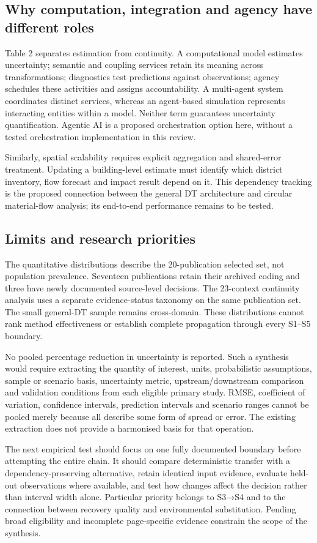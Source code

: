 \subsection{Why computation, integration and agency have different roles}
Table 2 separates estimation from continuity. A computational model estimates uncertainty; semantic and coupling services retain its meaning across transformations; diagnostics test predictions against observations; agency schedules these activities and assigns accountability. A multi-agent system coordinates distinct services, whereas an agent-based simulation represents interacting entities within a model. Neither term guarantees uncertainty quantification. Agentic AI is a proposed orchestration option here, without a tested orchestration implementation in this review.

Similarly, spatial scalability requires explicit aggregation and shared-error treatment. Updating a building-level estimate must identify which district inventory, flow forecast and impact result depend on it. This dependency tracking is the proposed connection between the general DT architecture and circular material-flow analysis; its end-to-end performance remains to be tested.


\subsection{Limits and research priorities}
The quantitative distributions describe the 20-publication selected set, not population prevalence. Seventeen publications retain their archived coding and three have newly documented source-level decisions. The 23-context continuity analysis uses a separate evidence-status taxonomy on the same publication set. The small general-DT sample remains cross-domain. These distributions cannot rank method effectiveness or establish complete propagation through every S1–S5 boundary.

No pooled percentage reduction in uncertainty is reported. Such a synthesis would require extracting the quantity of interest, units, probabilistic assumptions, sample or scenario basis, uncertainty metric, upstream/downstream comparison and validation conditions from each eligible primary study. RMSE, coefficient of variation, confidence intervals, prediction intervals and scenario ranges cannot be pooled merely because all describe some form of spread or error. The existing extraction does not provide a harmonised basis for that operation.

The next empirical test should focus on one fully documented boundary before attempting the entire chain. It should compare deterministic transfer with a dependency-preserving alternative, retain identical input evidence, evaluate held-out observations where available, and test how changes affect the decision rather than interval width alone. Particular priority belongs to S3→S4 and to the connection between recovery quality and environmental substitution. Pending broad eligibility and incomplete page-specific evidence constrain the scope of the synthesis.


